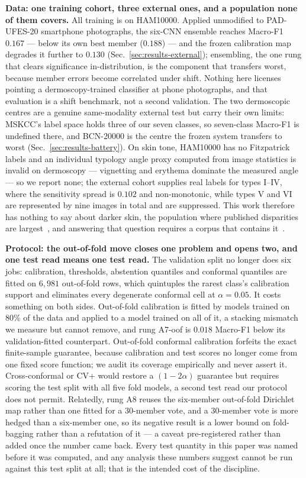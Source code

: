\documentclass[journal]{IEEEtran}
\begin{document}
\textbf{Data: one training cohort, three external ones, and a population none of them
covers.} All training is on HAM10000. Applied unmodified to PAD-UFES-20 smartphone
photographs, the six-CNN ensemble reaches Macro-F1 $0.167$ --- below its own best member
($0.188$) --- and the frozen calibration map degrades it further to $0.130$
(Sec.~\ref{sec:results-external}); ensembling, the one rung that clears significance
in-distribution, is the component that transfers worst, because member errors become
correlated under shift. Nothing here licenses pointing a dermoscopy-trained classifier at
phone photographs, and that evaluation is a shift benchmark, not a second validation. The two
dermoscopic centres are a genuine same-modality external test but carry their own limits:
MSKCC's label space holds three of our seven classes, so seven-class Macro-F1 is undefined
there, and BCN-20000 is the centre the frozen system transfers to worst
(Sec.~\ref{sec:results-battery}). On skin tone, HAM10000 has no Fitzpatrick labels and an
individual typology angle proxy computed from image statistics is invalid on dermoscopy ---
vignetting and erythema dominate the measured angle --- so we report none; the external cohort
supplies real labels for types I--IV, where the sensitivity spread is $0.102$ and
non-monotonic, while types V and VI are represented by nine images in total and are
suppressed. This work therefore has nothing to say about darker skin, the population where
published disparities are largest~\cite{daneshjou2022disparities}, and answering that
question requires a corpus that contains it~\cite{groh2021fitzpatrick17k}.

\textbf{Protocol: the out-of-fold move closes one problem and opens two, and one test read
means one test read.} The validation split no longer does six jobs: calibration, thresholds,
abstention quantiles and conformal quantiles are fitted on $6{,}981$ out-of-fold rows, which
quintuples the rarest class's calibration support and eliminates every degenerate conformal
cell at $\alpha=0.05$. It costs something on both sides. Out-of-fold calibration is fitted by
models trained on $80\%$ of the data and applied to a model trained on all of it, a stacking
mismatch we measure but cannot remove, and rung A7-oof is $0.018$ Macro-F1 below its
validation-fitted counterpart. Out-of-fold conformal calibration forfeits the exact
finite-sample guarantee, because calibration and test scores no longer come from one fixed
score function; we audit its coverage empirically and never assert it. Cross-conformal or CV+
would restore a $(1-2\alpha)$ guarantee but requires scoring the test split with all five fold
models, a second test read our protocol does not permit. Relatedly, rung A8 reuses the
six-member out-of-fold Dirichlet map rather than one fitted for a $30$-member vote, and a
$30$-member vote is more hedged than a six-member one, so its negative result is a lower
bound on fold-bagging rather than a refutation of it --- a caveat pre-registered rather than
added once the number came back. Every test quantity in this paper was named before it was
computed, and any analysis these numbers suggest cannot be run against this test split at
all; that is the intended cost of the discipline.
\end{document}
